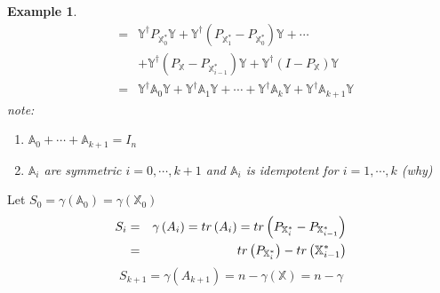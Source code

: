 \documentclass{article}
\newtheorem{example}[theorem]{Example}
\begin{document}
\begin{example}
\begin{eqnarray*}
&=&\mathbb{Y}^{\dagger }P_{\mathbb{X}_{0}^{\ast }}\mathbb{Y}+\mathbb{Y}%
^{\dagger }\left( P_{\mathbb{X}_{1}^{\ast }}-P_{\mathbb{X}_{0}^{\ast
}}\right) \mathbb{Y}+\cdots \\
&&+\mathbb{Y}^{\dagger }\left( P_{\mathbb{X}}-P_{\mathbb{X}_{i-1}^{\ast
}}\right) \mathbb{Y}+\mathbb{Y}^{\dagger }\left( I-P_{\mathbb{X}}\right) 
\mathbb{Y} \\
&=&\mathbb{Y}^{\dagger }\mathbb{A}_{0}\mathbb{Y+Y}^{\dagger }\mathbb{A}_{1}%
\mathbb{Y+\cdots +Y}^{\dagger }\mathbb{A}_{k}\mathbb{Y+Y}^{\dagger }\mathbb{A%
}_{k+1}\mathbb{Y}
\end{eqnarray*}%
\newline
\newline
note:

\begin{enumerate}
\item $\mathbb{A}_{0}+\cdots +\mathbb{A}_{k+1}=I_{n}$

\item $\mathbb{A}_{i}$ are symmetric $i=0,\cdots ,k+1$ and\newline
$\mathbb{A}_{i}$ is idempotent for $i=1,\cdots ,k$ (why)
\end{enumerate}
\end{example}

\bigskip

Let $S_{0}=\gamma \left( \mathbb{A}_{0}\right) =\gamma \left( \mathbb{X}%
_{0}\right) $%
\begin{eqnarray*}
S_{i} &=&\gamma \left( A_{i}\right) =tr\left( A_{i}\right) =tr\left( P_{%
\mathbb{X}_{i}^{\ast }}-P_{\mathbb{X}_{i-1}^{\ast }}\right) \\
&=&tr\left( P_{\mathbb{X}_{i}^{\ast }}\right) -tr\left( \mathbb{X}%
_{i-1}^{\ast }\right)
\end{eqnarray*}%
\begin{equation*}
S_{k+1}=\gamma \left( A_{k+1}\right) =n-\gamma \left( \mathbb{X}\right)
=n-\gamma
\end{equation*}

\bigskip
\end{document}
